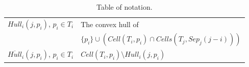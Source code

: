 \documentclass[12pt,a4paper,USenglish,cleveref, autoref, thm-restate]{article}
\newcommand{\ovar}[1]{\overrightarrow{#1}}
\newcommand{\Cell}{\mathit{Cell}}
\newcommand{\Cells}{\mathit{Cells}}
\newcommand{\Sep}{\mathit{Sep}}
\newcommand{\Hull}{\mathit{Hull}}
\newcommand{\mcS}{\mathcal{S}}
\newcommand{\john}[1]{\textcolor{red}{#1}}
\newcommand{\yakov}[1]{\textcolor{blue}{Yakov: #1}}
\newcommand{\ovar}[1]{\overrightarrow{#1}}
\newcommand{\Cell}{\mathit{Cell}}
\newcommand{\Cells}{\mathit{Cells}}
\newcommand{\Sep}{\mathit{Sep}}
\newcommand{\Hull}{\mathit{Hull}}
\newcommand{\mcS}{\mathcal{S}}
\newcommand{\john}[1]{\textcolor{red}{#1}}
\newcommand{\yakov}[1]{\textcolor{blue}{Yakov: #1}}
\newcommand{\ovar}[1]{\overrightarrow{#1}}
\newcommand{\Cell}{\mathit{Cell}}
\newcommand{\Cells}{\mathit{Cells}}
\newcommand{\Sep}{\mathit{Sep}}
\newcommand{\Hull}{\mathit{Hull}}
\newcommand{\mcS}{\mathcal{S}}
\newcommand{\john}[1]{\textcolor{red}{#1}}
\newcommand{\yakov}[1]{\textcolor{blue}{Yakov: #1}}
\begin{document}
\begin{table}
\begin{tabular}{|c|p{3.5in}|}
$\Hull_i(j,p_i)$, $p_i \in T_i$ & The convex hull of\\
 & \hspace{.5cm} $ \{p_i\} \cup ( \Cell(T_i,p_i) \cap   \Cells(T_j,\Sep_j(j-i)) ) $
\\
$\overline{\Hull}_i(j,p_i)$, $p_i \in T_i$ & 
$\Cell(T_i,p_i) \setminus \Hull_i(j,p_i)$
\\ \hline
\end{tabular}

\caption{
    Table of notation. }
    \label{table-of-notation}
\end{table}
\end{document}
